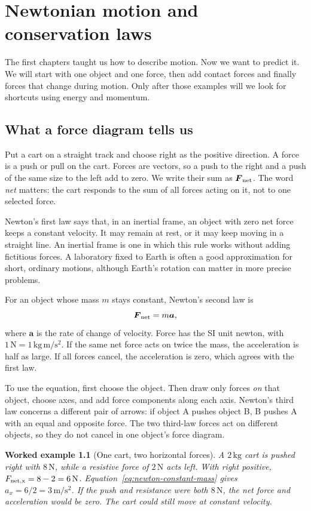 \documentclass[11pt,oneside]{book}
\newcommand{\vect}[1]{\boldsymbol{#1}}
\theoremstyle{reviewstyle}
\newtheorem{example}{Worked example}[chapter]
\begin{document}
\chapter{Newtonian motion and conservation laws}
The first chapters taught us how to describe motion. Now we want to predict it. We will start with one object and one force, then add contact forces and finally forces that change during motion. Only after those examples will we look for shortcuts using energy and momentum.

\section{What a force diagram tells us}
Put a cart on a straight track and choose right as the positive direction. A force is a push or pull on the cart. Forces are vectors, so a push to the right and a push of the same size to the left add to zero. We write their sum as $\vect F_{\rm net}$. The word \emph{net} matters: the cart responds to the sum of all forces acting on it, not to one selected force.

Newton's first law says that, in an inertial frame, an object with zero net force keeps a constant velocity. It may remain at rest, or it may keep moving in a straight line. An inertial frame is one in which this rule works without adding fictitious forces. A laboratory fixed to Earth is often a good approximation for short, ordinary motions, although Earth's rotation can matter in more precise problems.

For an object whose mass $m$ stays constant, Newton's second law is
\begin{equation}
\vect F_{\rm net}=m\vect a,
\label{eq:newton-constant-mass}
\end{equation}
where $\vect a$ is the rate of change of velocity. Force has the SI unit newton, with $1\,\mathrm N=1\,\mathrm{kg\,m/s^2}$. If the same net force acts on twice the mass, the acceleration is half as large. If all forces cancel, the acceleration is zero, which agrees with the first law.

To use the equation, first choose the object. Then draw only forces \emph{on} that object, choose axes, and add force components along each axis. Newton's third law concerns a different pair of arrows: if object A pushes object B, B pushes A with an equal and opposite force. The two third-law forces act on different objects, so they do not cancel in one object's force diagram.

\begin{example}[One cart, two horizontal forces]
A $2\,\mathrm{kg}$ cart is pushed right with $8\,\mathrm N$, while a resistive force of $2\,\mathrm N$ acts left. With right positive, $F_{\rm net,x}=8-2=6\,\mathrm N$. Equation~\eqref{eq:newton-constant-mass} gives $a_x=6/2=3\,\mathrm{m/s^2}$. If the push and resistance were both $8\,\mathrm N$, the net force and acceleration would be zero. The cart could still move at constant velocity.
\end{example}
\end{document}
